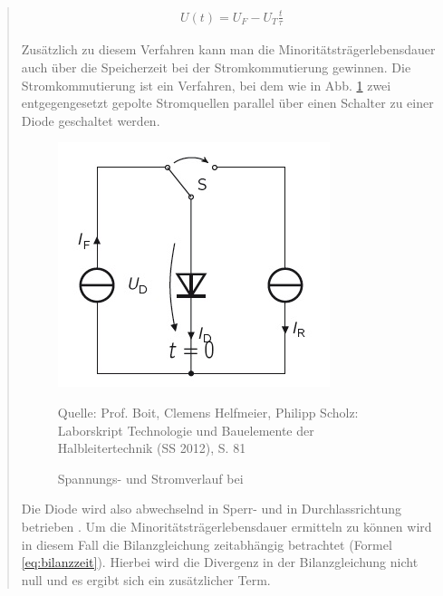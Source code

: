 \begin{quote}
    \begin{equation}
         \begin{split}
             U(t)=U_{F}-U_{T}\frac{t}{\tau}
         \end{split}
         \label{eq:gerade}
    \end{equation}

    Zusätzlich zu diesem Verfahren kann man die Minoritätsträgerlebensdauer auch
    über die Speicherzeit bei der Stromkommutierung gewinnen. Die
    Stromkommutierung ist ein Verfahren, bei dem wie in Abb. \ref{fig:komm} zwei
    entgegengesetzt gepolte Stromquellen parallel über einen Schalter zu einer
    Diode geschaltet werden.

    \vspace{2em}

    \begin{figure}[H]
        \centering
        \includegraphics[scale=1]{./SchaltverhaltenBilder/Kommutierschaltung.jpg}
        \caption{Spannungs- und Stromverlauf bei }
             \begin{center}
                 \small Quelle: Prof. Boit, Clemens Helfmeier, Philipp Scholz: Laborskript Technologie und Bauelemente der Halbleitertechnik (SS 2012), S. 81
             \end{center}
        \label{fig:komm}
    \end{figure}

    \vspace{2em}

    Die Diode wird also abwechselnd in Sperr- und in Durchlassrichtung betrieben
    . Um die Minoritätsträgerlebensdauer ermitteln zu können wird in diesem Fall
    die Bilanzgleichung zeitabhängig betrachtet (Formel \ref{eq:bilanzzeit}).
    Hierbei wird die Divergenz in der Bilanzgleichung nicht null und es ergibt
    sich ein zusätzlicher Term.


\end{quote}
